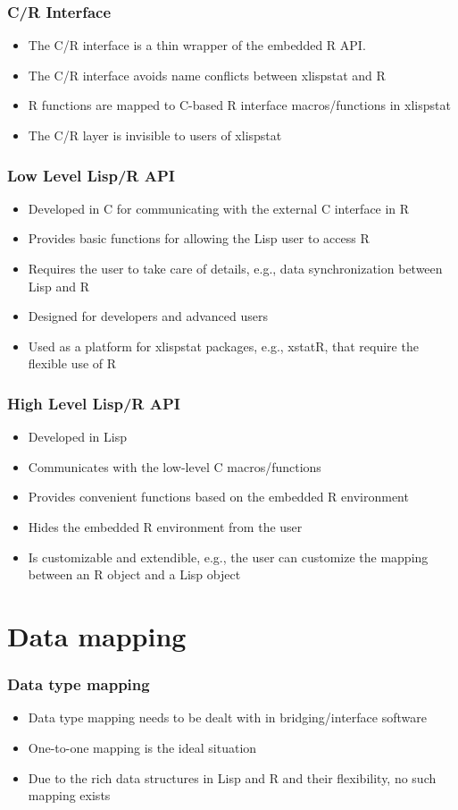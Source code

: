 \documentclass{beamer}
\begin{document}
\begin{frame}
\frametitle{C/R Interface}
\begin{itemize}
	\item The C/R interface is a thin wrapper of the embedded R API.
	\item The C/R interface avoids name conflicts between xlispstat and R
	\item R functions are mapped to C-based R interface macros/functions in xlispstat
	\item The C/R layer is invisible to users of xlispstat
\end{itemize}
\end{frame}

\begin{frame}
\frametitle{Low Level Lisp/R API}
\begin{itemize}
	\item Developed in C for communicating with the external C interface in R
	\item Provides basic functions for allowing the Lisp user to access R
	\item Requires the user to take care of details, e.g., data synchronization between Lisp and R
	\item Designed for developers and advanced users
	\item Used as a platform for xlispstat packages, e.g., xstatR, that require the flexible use of R 
\end{itemize}
\end{frame}

\begin{frame}
\frametitle{High Level Lisp/R API}
\begin{itemize}
	\item Developed in Lisp
	\item Communicates with the low-level C macros/functions
	\item Provides convenient functions based on the embedded R environment
	\item Hides the embedded R environment from the user
	\item Is customizable and extendible, e.g., the user can customize the mapping between an R object and a Lisp object 
\end{itemize}
\end{frame}

\section{Data mapping}
\begin{frame}
\frametitle{Data type mapping}
\begin{itemize}
	\item Data type mapping needs to be dealt with in bridging/interface software
	\item One-to-one mapping is the ideal situation
	\item Due to the rich data structures in Lisp and R and their flexibility, no such mapping exists
\end{itemize}
\end{frame}
\end{document}

